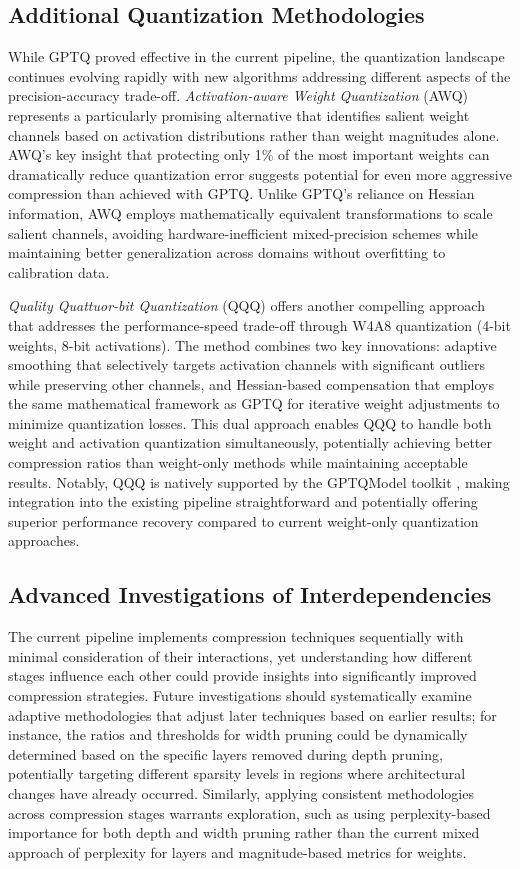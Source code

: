 \subsection{Additional Quantization Methodologies}

While GPTQ proved effective in the current pipeline, the quantization landscape continues evolving rapidly with new algorithms addressing different aspects of the precision-accuracy trade-off. \textit{Activation-aware Weight Quantization} (AWQ) \cite{awq} represents a particularly promising alternative that identifies salient weight channels based on activation distributions rather than weight magnitudes alone. AWQ's key insight that protecting only 1\% of the most important weights can dramatically reduce quantization error suggests potential for even more aggressive compression than achieved with GPTQ. Unlike GPTQ's reliance on Hessian information, AWQ employs mathematically equivalent transformations to scale salient channels, avoiding hardware-inefficient mixed-precision schemes while maintaining better generalization across domains without overfitting to calibration data.

\textit{Quality Quattuor-bit Quantization} (QQQ) \cite{qqq} offers another compelling approach that addresses the performance-speed trade-off through W4A8 quantization (4-bit weights, 8-bit activations). The method combines two key innovations: adaptive smoothing that selectively targets activation channels with significant outliers while preserving other channels, and Hessian-based compensation that employs the same mathematical framework as GPTQ for iterative weight adjustments to minimize quantization losses. This dual approach enables QQQ to handle both weight and activation quantization simultaneously, potentially achieving better compression ratios than weight-only methods while maintaining acceptable results. Notably, QQQ is natively supported by the GPTQModel toolkit \cite{gptqmodel}, making integration into the existing pipeline straightforward and potentially offering superior performance recovery compared to current weight-only quantization approaches.

\subsection{Advanced Investigations of Interdependencies}
The current pipeline implements compression techniques sequentially with minimal consideration of their interactions, yet understanding how different stages influence each other could provide insights into significantly improved compression strategies. Future investigations should systematically examine adaptive methodologies that adjust later techniques based on earlier results; for instance, the ratios and thresholds for width pruning could be dynamically determined based on the specific layers removed during depth pruning, potentially targeting different sparsity levels in regions where architectural changes have already occurred. Similarly, applying consistent methodologies across compression stages warrants exploration, such as using perplexity-based importance for both depth and width pruning rather than the current mixed approach of perplexity for layers and magnitude-based metrics for weights.

